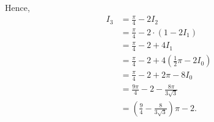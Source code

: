 Hence,
\begin{align*}
    I_3 & = \frac{\pi}{4} - 2 I_2                                     \\
        & = \frac{\pi}{4} - 2 \cdot \left(1 - 2 I_1\right)            \\
        & = \frac{\pi}{4} - 2 + 4 I_1                                 \\
        & = \frac{\pi}{4} - 2 + 4 \left(\frac{1}{2}\pi - 2 I_0\right) \\
        & = \frac{\pi}{4} - 2 + 2\pi - 8 I_0                          \\
        & = \frac{9\pi}{4} - 2 - \frac{8\pi}{3 \sqrt{3}}              \\
        & = \left(\frac{9}{4} - \frac{8}{3 \sqrt{3}}\right) \pi - 2.
\end{align*}
